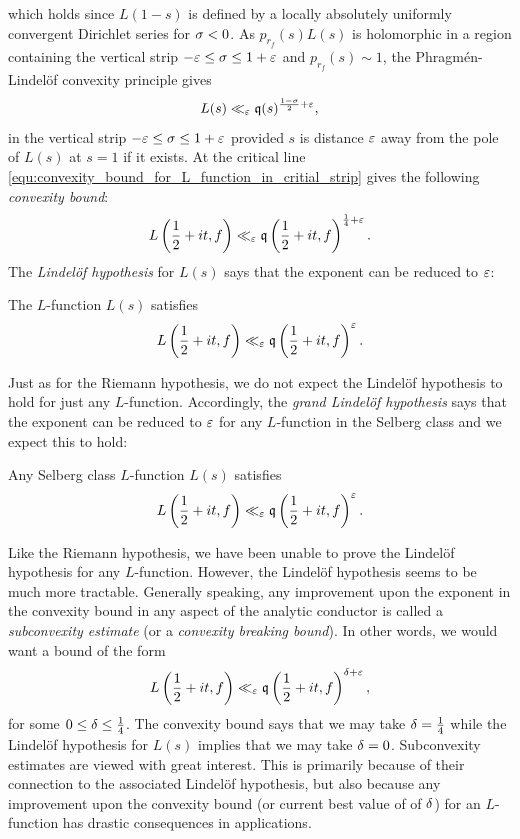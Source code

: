\documentclass[12pt]{article}
\begin{document}
    which holds since \(L(1-s)\) is defined by a locally absolutely uniformly convergent Dirichlet series for \(\sigma < 0\). As \(p_{r_{f}}(s)L(s)\) is holomorphic in a region containing the vertical strip \(-\varepsilon \le \sigma \le 1+\varepsilon\) and \(p_{r_{f}}(s) \sim 1\), the Phragm\'en-Lindel\"of convexity principle gives
    \begin{equation}\label{equ:convexity_bound_for_L_function_in_critial_strip}
      L(s) \ll_{\varepsilon} \mathfrak{q}(s)^{\frac{1-\sigma}{2}+\varepsilon},
    \end{equation}
    in the vertical strip \(-\varepsilon \le \sigma \le 1+\varepsilon\) provided \(s\) is distance \(\varepsilon\) away from the pole of \(L(s)\) at \(s = 1\) if it exists. At the critical line \cref{equ:convexity_bound_for_L_function_in_critial_strip} gives the following \textit{convexity bound}:
    \[
      L\left(\frac{1}{2}+it,f\right) \ll_{\varepsilon} \mathfrak{q}\left(\frac{1}{2}+it,f\right)^{\frac{1}{4}+\varepsilon}.
    \]
    The \textit{Lindel\"of hypothesis} for \(L(s)\) says that the exponent can be reduced to \(\varepsilon\):

    \begin{conjecture*}
      The \(L\)-function \(L(s)\) satisfies
      \[
        L\left(\frac{1}{2}+it,f\right) \ll_{\varepsilon} \mathfrak{q}\left(\frac{1}{2}+it,f\right)^{\varepsilon}.
      \]
    \end{conjecture*}

    Just as for the Riemann hypothesis, we do not expect the Lindel\"of hypothesis to hold for just any \(L\)-function. Accordingly, the \textit{grand Lindel\"of hypothesis} says that the exponent can be reduced to \(\varepsilon\) for any \(L\)-function in the Selberg class and we expect this to hold:

    \begin{conjecture*}
      Any Selberg class \(L\)-function \(L(s)\) satisfies
      \[
        L\left(\frac{1}{2}+it,f\right) \ll_{\varepsilon} \mathfrak{q}\left(\frac{1}{2}+it,f\right)^{\varepsilon}.
      \]
    \end{conjecture*}

    Like the Riemann hypothesis, we have been unable to prove the Lindel\"of hypothesis for any \(L\)-function. However, the Lindel\"of hypothesis seems to be much more tractable. Generally speaking, any improvement upon the exponent in the convexity bound in any aspect of the analytic conductor is called a \textit{subconvexity estimate} (or a \textit{convexity breaking bound}). In other words, we would want a bound of the form
    \[
      L\left(\frac{1}{2}+it,f\right) \ll_{\varepsilon} \mathfrak{q}\left(\frac{1}{2}+it,f\right)^{\delta+\varepsilon},
    \]
    for some \(0 \le \delta \le \frac{1}{4}\). The convexity bound says that we may take \(\delta = \frac{1}{4}\) while the Lindel\"of hypothesis for \(L(s)\) implies that we may take \(\delta = 0\). Subconvexity estimates are viewed with great interest. This is primarily because of their connection to the associated Lindel\"of hypothesis, but also because any improvement upon the convexity bound (or current best value of of \(\delta\)) for an \(L\)-function has drastic consequences in applications.
\end{document}
